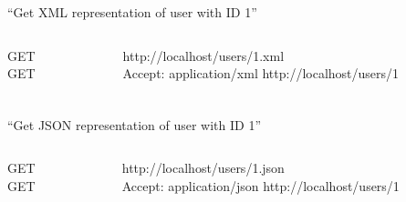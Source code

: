 
\begin{frame}
  \frametitle{\insertsection}
  \begin{center}
  ``Get XML representation of user with ID 1''
  \end{center}
  \begin{columns}
    \begin{column}{.2\textwidth}
      \begin{flushright}
      GET\\
      GET
      \end{flushright}
    \end{column}    
    \begin{column}{.8\textwidth}
      \begin{flushleft}
      http://localhost/users/1\alert{.xml}\\
      \alert{Accept: application/xml} http://localhost/users/1
      \end{flushleft}
    \end{column}    
  \end{columns}
\end{frame}

\begin{frame}
  \frametitle{\insertsection}
  \begin{center}
  ``Get JSON representation of user with ID 1''
  \end{center}
  \begin{columns}
    \begin{column}{.2\textwidth}
      \begin{flushright}
      GET\\
      GET
      \end{flushright}
    \end{column}    
    \begin{column}{.8\textwidth}
      \begin{flushleft}
      http://localhost/users/1\alert{.json}\\
      \alert{Accept: application/json} http://localhost/users/1
      \end{flushleft}
    \end{column}    
  \end{columns}
\end{frame}

